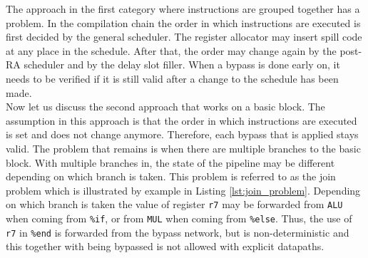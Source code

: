The approach in the first category where instructions are grouped together has a problem. In the compilation chain the order in which instructions are executed is first decided by the general scheduler. The register allocator may insert spill code at any place in the schedule. After that, the order may change again by the post-RA scheduler and by the delay slot filler. When a bypass is done early on, it needs to be verified if it is still valid after a change to the schedule has been made.\\


Now let us discuss the second approach that works on a basic block. The assumption in this approach is that the order in which instructions are executed is set and does not change anymore. Therefore, each bypass that is applied stays valid. 
The problem that remains is when there are multiple branches to the basic block. With multiple branches in, the state of the pipeline may be different depending on which branch is taken. This problem is referred to as the join problem which is illustrated by example in Listing \ref{lst:join_problem}. Depending on which branch is taken the value of register \texttt{r7} may be forwarded from \texttt{ALU} when coming from \texttt{\%if}, or from \texttt{MUL} when coming from \texttt{\%else}. Thus, the use of \texttt{r7} in \texttt{\%end} is forwarded from the bypass network, but is non-deterministic and this together with being bypassed is not allowed with explicit datapaths. 



